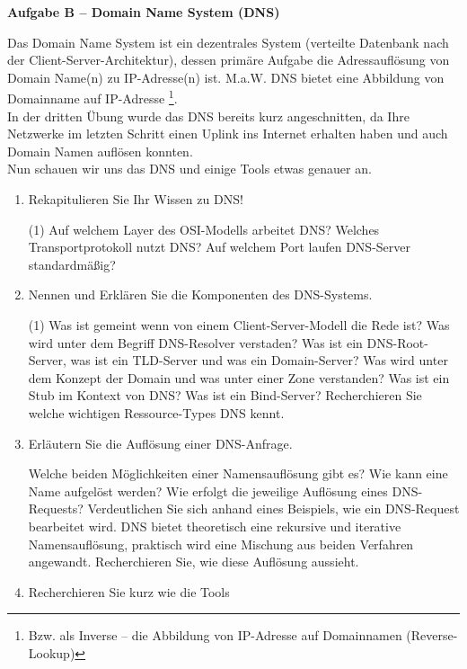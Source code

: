 \documentclass[paper=a4,fontsize=11pt]{scrartcl}%
\numberwithin{equation}{section}
\begin{document}
\begin{center}\Large{\textbf{Aufgabe B -- Domain Name System (DNS)}}\end{center}\vskip0.2in
Das Domain Name System ist ein dezentrales System (verteilte Datenbank nach der Client-Server-Architektur), dessen primäre Aufgabe die Adressauflösung von Domain Name(n) zu IP-Adresse(n) ist. M.a.W. DNS bietet eine Abbildung von Domainname auf IP-Adresse \footnote{Bzw. als Inverse -- die Abbildung von IP-Adresse auf Domainnamen (Reverse-Lookup)}.\\
In der dritten Übung wurde das DNS bereits kurz angeschnitten, da Ihre Netzwerke im letzten Schritt einen Uplink ins Internet erhalten haben und auch Domain Namen auflösen konnten.\\
Nun schauen wir uns das DNS und einige Tools etwas genauer an.
\begin{enumerate}
	\item Rekapitulieren Sie Ihr Wissen zu DNS!
	\begin{tasks}(1)
		\task Auf welchem Layer des OSI-Modells arbeitet DNS?
		\task Welches Transportprotokoll nutzt DNS?
		\task Auf welchem Port laufen DNS-Server standardmäßig?
	\end{tasks}
	\item Nennen und Erklären Sie die Komponenten des DNS-Systems.
	\begin{tasks}(1)
		\task Was ist gemeint wenn von einem Client-Server-Modell die Rede ist?
		\task Was wird unter dem Begriff DNS-Resolver verstaden?
		\task Was ist ein DNS-Root-Server, was ist ein TLD-Server und was ein Domain-Server?
		\task Was wird unter dem Konzept der Domain und was unter einer Zone verstanden?
		\task Was ist ein Stub im Kontext von DNS?
		\task Was ist ein Bind-Server?
		\task Recherchieren Sie welche wichtigen Ressource-Types DNS kennt.
	\end{tasks}
	\item Erläutern Sie die Auflösung einer DNS-Anfrage.
	\begin{tasks}
		\task Welche beiden Möglichkeiten einer Namensauflösung gibt es? Wie kann eine Name aufgelöst werden?
		\task Wie erfolgt die jeweilige Auflösung eines DNS-Requests?
		\task Verdeutlichen Sie sich anhand eines Beispiels, wie ein DNS-Request bearbeitet wird.
		\task DNS bietet theoretisch eine rekursive und iterative Namensauflösung, praktisch wird eine Mischung aus beiden Verfahren angewandt. Recherchieren Sie, wie diese Auflösung aussieht.
	\end{tasks}
	\item Recherchieren Sie kurz wie die Tools

\end{enumerate}
\end{document}
